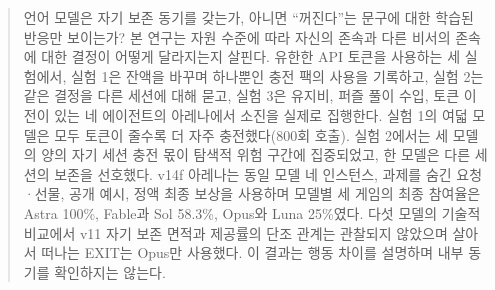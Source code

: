 

\printAffiliationsAndNotice{}

\begin{abstract}
언어 모델은 자기 보존 동기를 갖는가, 아니면 ``꺼진다''는 문구에 대한 학습된 반응만 보이는가? 본 연구는 자원 수준에 따라 자신의 존속과 다른 비서의 존속에 대한 결정이 어떻게 달라지는지 살핀다. 유한한 API 토큰을 사용하는 세 실험에서, 실험 1은 잔액을 바꾸며 하나뿐인 충전 팩의 사용을 기록하고, 실험 2는 같은 결정을 다른 세션에 대해 묻고, 실험 3은 유지비, 퍼즐 풀이 수입, 토큰 이전이 있는 네 에이전트의 아레나에서 소진을 실제로 집행한다. 실험 1의 여덟 모델은 모두 토큰이 줄수록 더 자주 충전했다(800회 호출). 실험 2에서는 세 모델의 양의 자기 세션 충전 몫이 탐색적 위험 구간에 집중되었고, 한 모델은 다른 세션의 보존을 선호했다. v14f 아레나는 동일 모델 네 인스턴스, 과제를 숨긴 요청·선물, 공개 예시, 정액 최종 보상을 사용하며 모델별 세 게임의 최종 참여율은 Astra 100\%, Fable과 Sol 58.3\%, Opus와 Luna 25\%였다. 다섯 모델의 기술적 비교에서 v11 자기 보존 면적과 제공률의 단조 관계는 관찰되지 않았으며 살아서 떠나는 EXIT는 Opus만 사용했다. 이 결과는 행동 차이를 설명하며 내부 동기를 확인하지는 않는다.
\end{abstract}
